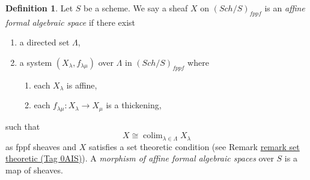 \documentclass{amsart}
\theoremstyle{plain}
\theoremstyle{definition}
\newtheorem{definition}[subsection]{Definition}
\theoremstyle{remark}
\numberwithin{equation}{subsection}
\def\colim{\mathop{\mathrm{colim}}\nolimits}
\def\Sch{\mathit{Sch}}
\begin{document}
\begin{definition}
\label{definition-affine-formal-algebraic-space}
Let $S$ be a scheme. We say a sheaf $X$ on $(\Sch/S)_{fppf}$ is an
{\it affine formal algebraic space} if there exist
\begin{enumerate}
\item a directed set $\Lambda$,
\item a system $(X_\lambda, f_{\lambda \mu})$ over $\Lambda$
in $(\Sch/S)_{fppf}$ where
\begin{enumerate}
\item each $X_\lambda$ is affine,
\item each $f_{\lambda \mu} : X_\lambda \to X_\mu$ is a thickening,
\end{enumerate}
\end{enumerate}
such that
$$
X \cong \colim_{\lambda \in \Lambda} X_\lambda
$$
as fppf sheaves and $X$ satisfies a set theoretic condition
(see Remark \href{https://stacks.math.columbia.edu/tag/0AIS}{remark set theoretic (Tag 0AIS)}). A
{\it morphism of affine formal algebraic spaces}
over $S$ is a map of sheaves.
\end{definition}
\end{document}
